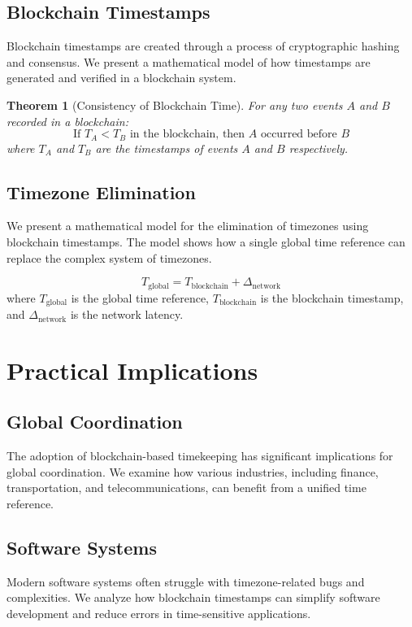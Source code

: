 \documentclass[12pt]{report}
\newtheorem{theorem}{Theorem}
\begin{document}
\section{Blockchain Timestamps}
Blockchain timestamps are created through a process of cryptographic hashing and consensus. We present a mathematical model of how timestamps are generated and verified in a blockchain system.

\begin{theorem}[Consistency of Blockchain Time]
For any two events \( A \) and \( B \) recorded in a blockchain:
\begin{equation}
\text{If } T_A < T_B \text{ in the blockchain, then } A \text{ occurred before } B
\end{equation}
where \( T_A \) and \( T_B \) are the timestamps of events \( A \) and \( B \) respectively.
\end{theorem}

\section{Timezone Elimination}
We present a mathematical model for the elimination of timezones using blockchain timestamps. The model shows how a single global time reference can replace the complex system of timezones.

\begin{equation}
T_{\text{global}} = T_{\text{blockchain}} + \Delta_{\text{network}}
\end{equation}
where \( T_{\text{global}} \) is the global time reference, \( T_{\text{blockchain}} \) is the blockchain timestamp, and \( \Delta_{\text{network}} \) is the network latency.

\chapter{Practical Implications}

\section{Global Coordination}
The adoption of blockchain-based timekeeping has significant implications for global coordination. We examine how various industries, including finance, transportation, and telecommunications, can benefit from a unified time reference.

\section{Software Systems}
Modern software systems often struggle with timezone-related bugs and complexities. We analyze how blockchain timestamps can simplify software development and reduce errors in time-sensitive applications.
\end{document}
